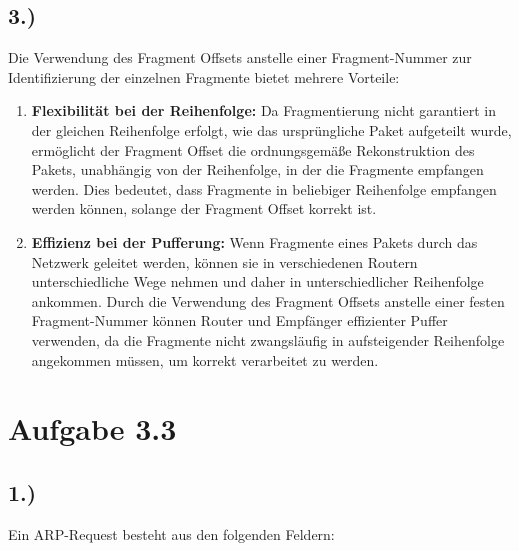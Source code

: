 \documentclass[a4paper]{scrartcl}
\begin{document}
\subsection*{3.)}
Die Verwendung des Fragment Offsets anstelle einer Fragment-Nummer zur Identifizierung der einzelnen Fragmente bietet mehrere Vorteile:

\begin{enumerate}
    \item \textbf{Flexibilität bei der Reihenfolge:} Da Fragmentierung nicht garantiert in der gleichen Reihenfolge erfolgt, wie das ursprüngliche Paket aufgeteilt wurde, ermöglicht der Fragment Offset die ordnungsgemäße Rekonstruktion des Pakets, unabhängig von der Reihenfolge, in der die Fragmente empfangen werden. Dies bedeutet, dass Fragmente in beliebiger Reihenfolge empfangen werden können, solange der Fragment Offset korrekt ist.
    
    \item \textbf{Effizienz bei der Pufferung:} Wenn Fragmente eines Pakets durch das Netzwerk geleitet werden, können sie in verschiedenen Routern unterschiedliche Wege nehmen und daher in unterschiedlicher Reihenfolge ankommen. Durch die Verwendung des Fragment Offsets anstelle einer festen Fragment-Nummer können Router und Empfänger effizienter Puffer verwenden, da die Fragmente nicht zwangsläufig in aufsteigender Reihenfolge angekommen müssen, um korrekt verarbeitet zu werden.
    
\end{enumerate}
\section*{Aufgabe 3.3}
\subsection*{1.)}
Ein ARP-Request besteht aus den folgenden Feldern:
\end{document}

